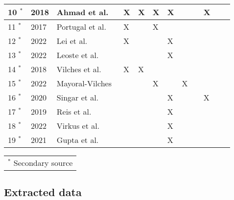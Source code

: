 \begin{table}[h!]
\begin{tabularx}{\textwidth}{|l|l|X|l|l|l|l|l|l|l|l|l|}
    10 $^{\ast}$ & 2018          & Ahmad et al.~\cite[]{analyzing_cyber_physical_threats_2018}                 & X          & X & X & X &  &  & X \\\hline
    11 $^{\ast}$ & 2017          & Portugal et al.~\cite[]{role_of_security_in_human_robot_2017}               & X &  & X &  &  &  &  \\\hline
    12 $^{\ast}$ & 2022          & Lei et al.~\cite[]{acceptance_telepresence_robots_2022}                     & X          &            &            & X          &  &  &  \\\hline
    13 $^{\ast}$ & 2022          & Leoste et al.~\cite[]{higher_edu_perception_on_tprs_2022}                   &            &            &            & X &  &  &  \\\hline
    14 $^{\ast}$ & 2018          & Vilches et al.~\cite[]{robot_security_framework_2018}                       & X          & X          &            &            &            &            &            \\\hline
    15 $^{\ast}$ & 2022          & Mayoral-Vilches~\cite[]{robot_security_review_2022}                         &            &            & X          &            & X          &            &            \\\hline
    16 $^{\ast}$ & 2020          & Singar et al.~\cite[]{role_of_cyber_security_in_higher_edu_2020} &  &  &  & X &  &  & X \\\hline
    17 $^{\ast}$ & 2019          & Reis et al.~\cite[]{telepresence_robots_in_classroom_2019}                  &            &            &            & X &  &  &  \\\hline
    18 $^{\ast}$ & 2022          & Virkus et al.~\cite[]{telepresence_perspective_psychology_educational_2022} &  &  &  & X &  &  &  \\\hline
    19 $^{\ast}$ & 2021          & Gupta et al.~\cite[]{humans_and_robots_relation_2021}                       &            &            &            & X          &            &            &            \\\hline

  \end{tabularx}
  \begin{tabularx}{\textwidth}{X}
    \footnotesize{$^{\ast}$ Secondary source}\\
  \end{tabularx}
\end{table}

\newpage
\subsection{Extracted data}\label{subsec:extracted-data}

